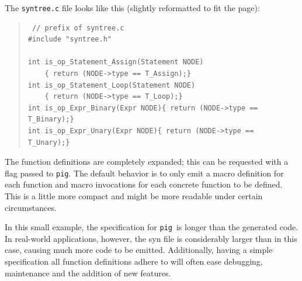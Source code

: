 \documentclass[a4paper,12pt]{article}
\def\pig{{\tt pig}}
\begin{document}
The \verb+syntree.c+ file looks like this (slightly reformatted to
fit the page):

\begin{quote}
\begin{verbatim}
 // prefix of syntree.c
#include "syntree.h"

int is_op_Statement_Assign(Statement NODE)
    { return (NODE->type == T_Assign);}
int is_op_Statement_Loop(Statement NODE)
    { return (NODE->type == T_Loop);}
int is_op_Expr_Binary(Expr NODE){ return (NODE->type == T_Binary);}
int is_op_Expr_Unary(Expr NODE){ return (NODE->type == T_Unary);}
\end{verbatim}
\end{quote}

The function definitions are completely expanded; this can be
requested with a flag passed to \pig. The default behavior is to
only emit a macro definition for each function and macro invocations
for each concrete function to be defined. This is a little more
compact and might be more readable under certain circumstances.

In this small example, the specification for \pig\ is longer than
the generated code. In real-world applications, however, the syn
file is considerably larger than in this case, causing much more
code to be emitted. Additionally, having a simple specification all
function definitions adhere to will often ease debugging,
maintenance and the addition of new features.
\end{document}
